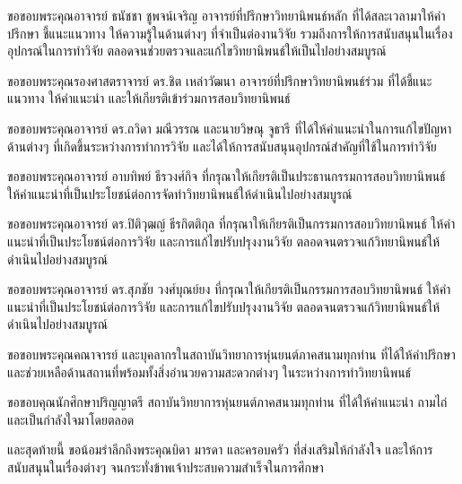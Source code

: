 \begin{acknowledgements}
ขอขอบพระคุณอาจารย์ ธนัชชา ชูพจน์เจริญ อาจารย์ที่ปรึกษาวิทยานิพนธ์หลัก
ที่ได้สละเวลามาให้คำปรึกษา ชี้แนะแนวทาง ให้ความรู้ในด้านต่างๆ ที่จำเป็นต่องานวิจัย รวมถึงการให้การสนับสนุนในเรื่องอุปกรณ์ในการทำวิจัย
ตลอดจนช่วยตรวจและแก้ไขวิทยานิพนธ์ให้เป็นไปอย่างสมบูรณ์

ขอขอบพระคุณรองศาสตราจารย์ ดร.ชิต เหล่าวัฒนา อาจารย์ที่ปรึกษาวิทยานิพนธ์ร่วม
ที่ได้ชี้แนะแนวทาง ให้คำแนะนำ และให้เกียรติเข้าร่วมการสอบวิทยานิพนธ์

ขอขอบพระคุณอาจารย์ ดร.ถวิดา มณีวรรณ และนายวิษณุ จูธารี ที่ได้ให้คำแนะนำในการแก้ไขปัญหาด้านต่างๆ
ที่เกิดขึ้นระหว่างการทำการวิจัย และได้ให้การสนับสนุนอุปกรณ์สำคัญที่ใช้ในการทำวิจัย

ขอขอบพระคุณอาจารย์ อาบทิพย์ ธีรวงศ์กิจ ที่กรุณาให้เกียรติเป็นประธานกรรมการสอบวิทยานิพนธ์
ให้คำแนะนำที่เป็นประโยชน์ต่อการจัดทำวิทยานิพนธ์ให้ดำเนินไปอย่างสมบูรณ์

ขอขอบพระคุณอาจารย์ ดร.ปิติวุฒญ์ ธีรกิตติกุล ที่กรุณาให้เกียรติเป็นกรรมการสอบวิทยานิพนธ์ 
ให้คำแนะนำที่เป็นประโยชน์ต่อการวิจัย และการแก้ไขปรับปรุงงานวิจัย ตลอดจนตรวจแก้วิทยานิพนธ์ให้ดำเนินไปอย่างสมบูรณ์

ขอขอบพระคุณอาจารย์ ดร.สุภชัย วงศ์บุณย์ยง ที่กรุณาให้เกียรติเป็นกรรมการสอบวิทยานิพนธ์ 
ให้คำแนะนำที่เป็นประโยชน์ต่อการวิจัย และการแก้ไขปรับปรุงงานวิจัย ตลอดจนตรวจแก้วิทยานิพนธ์ให้ดำเนินไปอย่างสมบูรณ์

ขอขอบพระคุณคณาจารย์ และบุคลากรในสถาบันวิทยาการหุ่นยนต์ภาคสนามทุกท่าน
ที่ได้ให้คำปรึกษาและช่วยเหลือด้านสถานที่พร้อมทั้งสิ่งอำนวยความสะดวกต่างๆ ในระหว่างการทำวิทยานิพนธ์

ขอขอบคุณนักศึกษาปริญญาตรี สถาบันวิทยาการหุ่นยนต์ภาคสนามทุกท่าน
ที่ได้ให้คำแนะนำ ถามไถ่ และเป็นกำลังใจมาโดยตลอด

และสุดท้ายนี้ ขอน้อมรำลึกถึงพระคุณบิดา มารดา และครอบครัว ที่ส่งเสริมให้กำลังใจ
และให้การสนับสนุนในเรื่องต่างๆ จนกระทั่งข้าพเจ้าประสบความสำเร็จในการศึกษา
\end{acknowledgements}